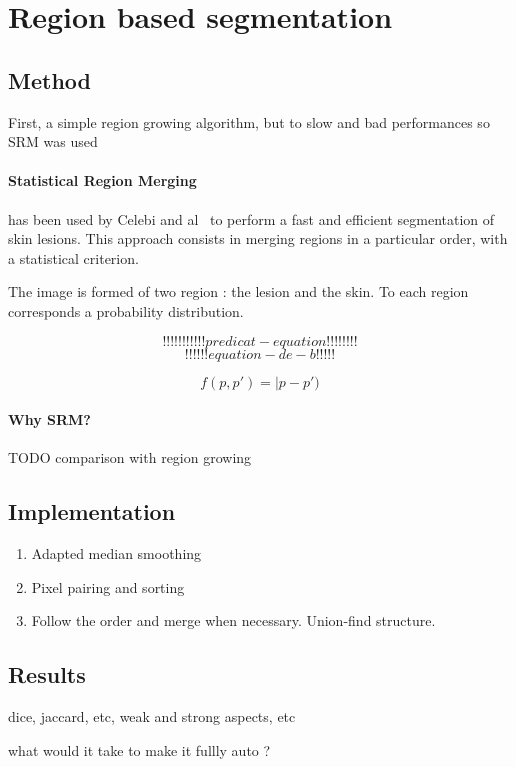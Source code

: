 \documentclass[a4paper,10pt]{article}
\begin{document}
\section{Region based segmentation}
\subsection{Method}
First, a simple region growing algorithm, but to slow and bad performances so SRM was used
\paragraph{ Statistical Region Merging~\cite{nock_statistical_2004} }has been 
used by Celebi and al~\cite{celebi_border_2008} to perform a fast and efficient 
segmentation of skin lesions. This approach consists in merging regions in a particular order, with a statistical criterion.

The image is formed of two region : the lesion and the skin. To each region corresponds a probability distribution.


\begin{equation}
!!!!!!!!!!!predicat-equation!!!!!!!!
\end{equation}
$$
!!!!!!equation-de - b!!!!!
$$

$$
f(p,p')=|p-p')
$$

\paragraph{Why SRM?}
TODO comparison with region growing
\subsection{Implementation}

\begin{enumerate}
	\item Adapted median smoothing
	\item Pixel pairing and sorting
	\item Follow the order and merge when necessary. Union-find structure.
\end{enumerate}

\subsection{Results}
dice, jaccard, etc, weak and strong aspects, etc

what would it take to make it fullly auto ?
\end{document}
